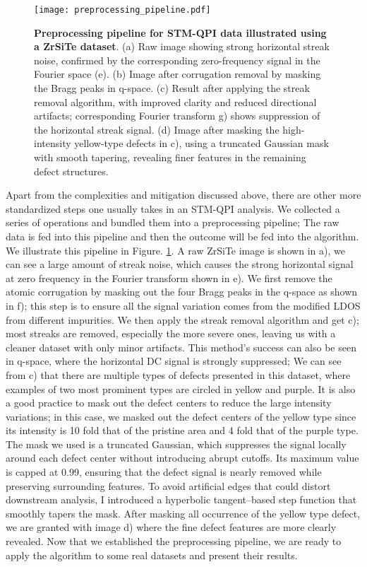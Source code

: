 \begin{figure}
	\texttt{[image: preprocessing\_pipeline.pdf]} 
	\centering
	\caption[\textbf{Preprocessing pipeline for STM-QPI data illustrated using a ZrSiTe dataset}]{\textbf{Preprocessing pipeline for STM-QPI data illustrated using a ZrSiTe dataset}. (a) Raw image showing strong horizontal streak noise, confirmed by the corresponding zero-frequency signal in the Fourier space (e). (b) Image after corrugation removal by masking the Bragg peaks in q-space. (c) Result after applying the streak removal algorithm, with improved clarity and reduced directional artifacts; corresponding Fourier transform g) shows suppression of the horizontal streak signal. (d) Image after masking the high-intensity yellow-type defects in c), using a truncated Gaussian mask with smooth tapering, revealing finer features in the remaining defect structures.}
	\label{fig:pipeline}
\end{figure}

Apart from the complexities and mitigation discussed above, there are other more standardized steps one usually takes in an STM-QPI analysis. We collected a series of operations and bundled them into a preprocessing pipeline; The raw data is fed into this pipeline and then the outcome will be fed into the algorithm. We illustrate this pipeline in Figure. \ref{fig:pipeline}. A raw ZrSiTe image is shown in a), we can see a large amount of streak noise, which causes the strong horizontal signal at zero frequency in the Fourier transform shown in e). We first remove the atomic corrugation by masking out the four Bragg peaks in the q-space as shown in f); this step is to ensure all the signal variation comes from the modified \ac{LDOS} from different impurities. We then apply the streak removal algorithm and get c); most streaks are removed, especially the more severe ones, leaving us with a cleaner dataset with only minor artifacts. This method's success can also be seen in q-space, where the horizontal DC signal is strongly suppressed; We can see from c) that there are multiple types of defects presented in this dataset, where examples of two most prominent types are circled in yellow and purple. It is also a good practice to mask out the defect centers to reduce the large intensity variations; in this case, we masked out the defect centers of the yellow type since its intensity is 10 fold that of the pristine area and 4 fold that of the purple type. The mask we used is a truncated Gaussian, which suppresses the signal locally around each defect center without introducing abrupt cutoffs. Its maximum value is capped at 0.99, ensuring that the defect signal is nearly removed while preserving surrounding features. To avoid artificial edges that could distort downstream analysis, I introduced a hyperbolic tangent–based step function that smoothly tapers the mask. After masking all occurrence of the yellow type defect, we are granted with image d) where the fine defect features are more clearly revealed. Now that we established the preprocessing pipeline, we are ready to apply the algorithm to some real datasets and present their results. 

